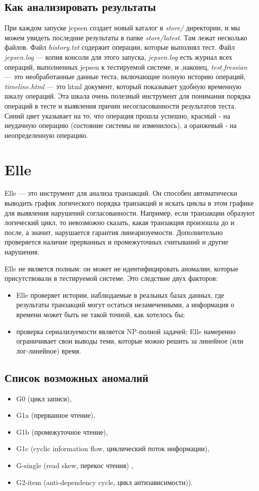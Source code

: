 \documentclass[12pt,  openany]{book}
\begin{document}
\subsection{Как анализировать результаты}
При каждом запуске jepsen создает новый каталог в \textit{store/} директории, и мы можем увидеть последние результаты в папке \textit{store/latest}. Там лежат несколько файлов.  Файл \textit{history.txt} содержит операции, которые выполнял тест.  Файл \textit{jepsen.log} --- копия консоли для этого запуска, \textit{jepsen.log} есть журнал всех операций, выполненных jepsen к тестируемой системе, и ,наконец, \textit{test.fressian} --- это необработанные данные теста, включающие полную историю операций, \textit{timeline.html} --- это html документ, который показывает удобную временную шкалу операций. Эта шкала очень полезный инструмент для понимания порядка операций в тесте и выявления причин несогласованности результатов теста. Синий цвет указывает на то, что операция прошла успешно, красный - на неудачную операцию (состояние системы не изменилось), а оранжевый - на неопределенную операцию.

\section{Elle}
\par
Elle --- это инструмент для анализа транзакций. Он способен автоматически выводить график логического порядка транзакций и искать циклы в этом графике для выявления нарушений согласованности. Например, если транзакции образуют логический цикл, то невозможно сказать, какая транзакция произошла до и после, а значит, нарушается гарантия линеаризуемости. 
Дополнительно проверяется наличие прерванных и промежуточных считываний и другие нарушения.
\par
Elle не является полным: он может не идентифицировать аномалии, которые присутствовали в тестируемой системе. Это следствие двух факторов:
\begin{itemize}
\item Elle проверяет истории, наблюдаемые в реальных базах данных, где результаты транзакций могут остаться незамеченными, а информация о времени может быть не такой точной, как хотелось бы;
\item проверка сериализуемости является NP-полной задачей; Elle намеренно ограничивает свои выводы теми, которые можно решить за линейное (или лог-линейное) время.
\end{itemize}
\subsection{Список возможных аномалий}
\begin{itemize}
\item G0 (цикл записи), 
\item G1a (прерванное чтение), 
\item G1b (промежуточное чтение), 
\item G1c (cyclic information flow, циклический поток информации), 
\item G-single (read skew, перекос чтения) ,
\item G2-item (anti-dependency cycle, цикл антизависимости)).
\end{itemize}
\end{document}
